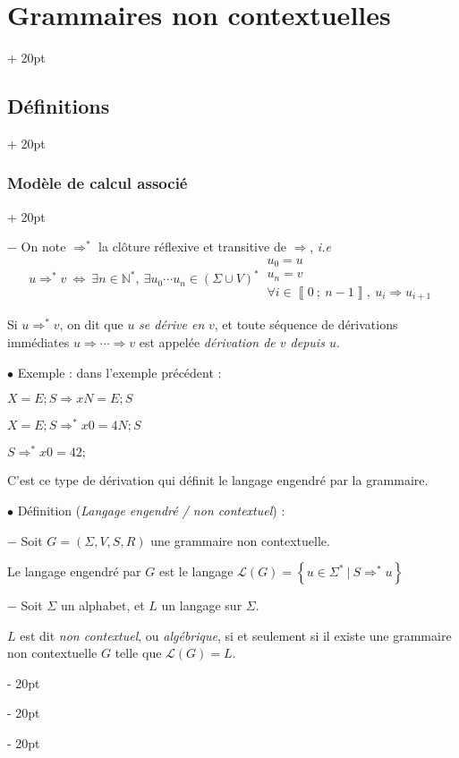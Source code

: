 \documentclass[a4paper, 12pt, twoside]{article}
\newcommand{\N}{\mathbb{N}} %
\newcommand{\nset}[2]{\left\llbracket #1\ ;\ #2 \right\rrbracket}
\newcommand{\lr}[1]{\left( #1 \right)}
\newcommand{\set}[1]{\left\{ #1 \right\}}
\newcommand{\ssi}{\ \Leftrightarrow \ }
\newcommand{\ind}[1][20pt]{\advance\leftskip + #1}
\newcommand{\deind}[1][20pt]{\advance\leftskip - #1}
\newenvironment{indt}[2][20pt]{#2 \par \ind[#1]}{\par \deind} %
\begin{document}
\begin{indt}{\section{Grammaires non contextuelles}}
\begin{indt}{\subsection{Définitions}}
\begin{indt}{\subsubsection{Modèle de calcul associé}}
                \vspace{6pt}
                
                $-$ On note $\Rightarrow^*$ la clôture réflexive et transitive de $\Rightarrow$, \textit{i.e}
                \[
                    u \Rightarrow^* v
                    \ssi
                    \exists n \in \N^*,\ \exists u_0 \cdots u_n \in \lr{\Sigma \cup V}^*\
                    \begin{array}{|l}
                        u_0 = u
                        \\
                        u_n = v
                        \\
                        \forall i \in \nset 0 {n - 1},\ u_i \Rightarrow u_{i + 1}
                    \end{array}
                \]

                Si $u \Rightarrow^* v$, on dit que $u$ \emph{se dérive en} $v$, et toute séquence de dérivations immédiates $u \Rightarrow \cdots \Rightarrow v$ est appelée \emph{dérivation de $v$ depuis $u$}.

                \vspace{12pt}
                
                $\bullet$ Exemple : dans l'exemple précédent :

                $X = E; S \Rightarrow xN = E; S$

                $X = E; S \Rightarrow^* x0 = 4N; S$

                $S \Rightarrow^* x0 = 42;$

                C'est ce type de dérivation qui définit le langage engendré par la grammaire.

                \vspace{12pt}
                
                $\bullet$ Définition (\textit{Langage engendré / non contextuel}) :

                $-$ Soit $G = \lr{\Sigma, V, S, R}$ une grammaire non contextuelle.

                Le langage engendré par $G$ est le langage $\mathcal L(G) = \set{u \in \Sigma^*\ |\ S \Rightarrow^* u}$

                $-$ Soit $\Sigma$ un alphabet, et $L$ un langage sur $\Sigma$.

                $L$ est dit \emph{non contextuel}, ou \emph{algébrique}, si et seulement si il existe une grammaire non contextuelle $G$ telle que $\mathcal L(G) = L$.
            \end{indt}


\end{indt}
\end{indt}
\end{document}
